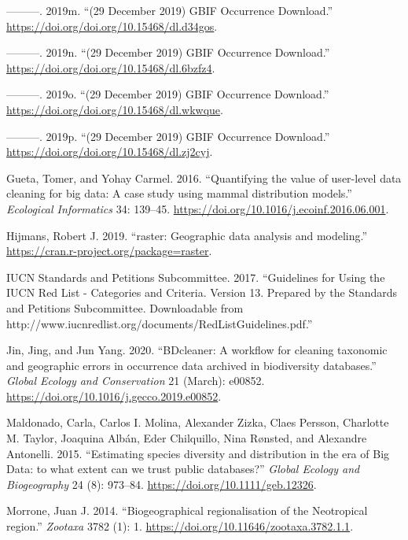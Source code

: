 \documentclass[fleqn,10pt,lineno]{wlpeerj} %
\begin{document}
\leavevmode\hypertarget{ref-GBIForg2019l}{}%
---------. 2019m. ``(29 December 2019) GBIF Occurrence Download.'' \url{https://doi.org/doi.org/10.15468/dl.d34gos}.

\leavevmode\hypertarget{ref-GBIForg2019m}{}%
---------. 2019n. ``(29 December 2019) GBIF Occurrence Download.'' \url{https://doi.org/doi.org/10.15468/dl.6bzfz4}.

\leavevmode\hypertarget{ref-GBIForg2019n}{}%
---------. 2019o. ``(29 December 2019) GBIF Occurrence Download.'' \url{https://doi.org/doi.org/10.15468/dl.wkwque}.

\leavevmode\hypertarget{ref-GBIForg2019o}{}%
---------. 2019p. ``(29 December 2019) GBIF Occurrence Download.'' \url{https://doi.org/doi.org/10.15468/dl.zj2cyj}.

\leavevmode\hypertarget{ref-Gueta2016}{}%
Gueta, Tomer, and Yohay Carmel. 2016. ``Quantifying the value of user-level data cleaning for big data: A case study using mammal distribution models.'' \emph{Ecological Informatics} 34: 139--45. \url{https://doi.org/10.1016/j.ecoinf.2016.06.001}.

\leavevmode\hypertarget{ref-Hijmans2019}{}%
Hijmans, Robert J. 2019. ``raster: Geographic data analysis and modeling.'' \url{https://cran.r-project.org/package=raster}.

\leavevmode\hypertarget{ref-IUCN2017}{}%
IUCN Standards and Petitions Subcommittee. 2017. ``Guidelines for Using the IUCN Red List - Categories and Criteria. Version 13. Prepared by the Standards and Petitions Subcommittee. Downloadable from http://www.iucnredlist.org/documents/RedListGuidelines.pdf.''

\leavevmode\hypertarget{ref-Jin2020}{}%
Jin, Jing, and Jun Yang. 2020. ``BDcleaner: A workflow for cleaning taxonomic and geographic errors in occurrence data archived in biodiversity databases.'' \emph{Global Ecology and Conservation} 21 (March): e00852. \url{https://doi.org/10.1016/j.gecco.2019.e00852}.

\leavevmode\hypertarget{ref-Maldonado2015}{}%
Maldonado, Carla, Carlos I. Molina, Alexander Zizka, Claes Persson, Charlotte M. Taylor, Joaquina Albán, Eder Chilquillo, Nina Rønsted, and Alexandre Antonelli. 2015. ``Estimating species diversity and distribution in the era of Big Data: to what extent can we trust public databases?'' \emph{Global Ecology and Biogeography} 24 (8): 973--84. \url{https://doi.org/10.1111/geb.12326}.

\leavevmode\hypertarget{ref-Morrone2014}{}%
Morrone, Juan J. 2014. ``Biogeographical regionalisation of the Neotropical region.'' \emph{Zootaxa} 3782 (1): 1. \url{https://doi.org/10.11646/zootaxa.3782.1.1}.
\end{document}
